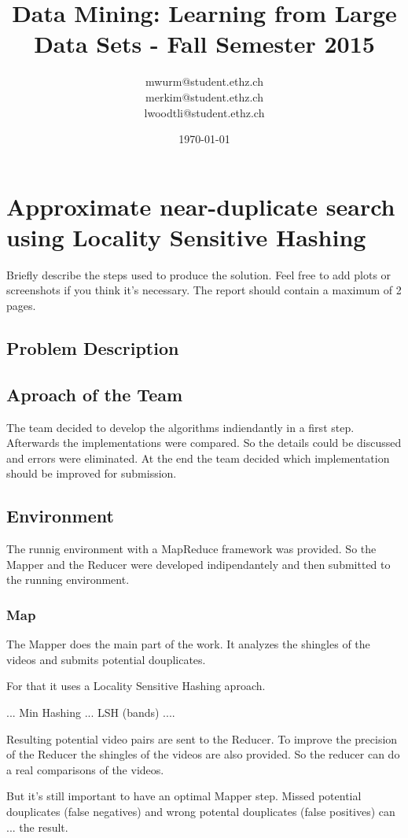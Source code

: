\documentclass[a4paper, 11pt]{article}
\title{Data Mining: Learning from Large Data Sets - Fall Semester 2015}
\author{mwurm@student.ethz.ch\\ merkim@student.ethz.ch\\ lwoodtli@student.ethz.ch\\}
\date{\today}
\begin{document}
\maketitle

\section*{Approximate near-duplicate search using Locality Sensitive Hashing} 
Briefly describe the steps used to produce the solution. Feel
free to add plots or screenshots if you think it's necessary. The
report should contain a maximum of 2 pages.

\subsection{Problem Description}

\subsection{Aproach of the Team}
The team decided to develop the algorithms indiendantly in a first step.
Afterwards the implementations were compared. So the details could be
discussed and errors were eliminated.
At the end the team decided which implementation should be improved for
submission.

\subsection{Environment}
The runnig environment with a MapReduce framework was provided. So the
Mapper and the Reducer were developed indipendantely and then submitted to
the running environment.

\subsubsection{Map}

The Mapper does the main part of the work. It analyzes the shingles of the
videos and submits potential douplicates.

For that it uses a Locality Sensitive Hashing aproach.

... Min Hashing ... LSH (bands) ....

Resulting potential video pairs are sent to the Reducer. To improve the precision
of the Reducer the shingles of the videos are also provided. So the reducer can
do a real comparisons of the videos.

But it's still important to have an optimal Mapper step. Missed potential douplicates
(false negatives) and wrong potental douplicates (false positives) can ... the result.
\end{document}
